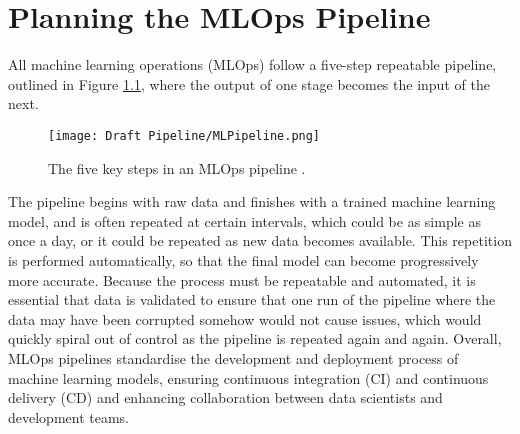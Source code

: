 \chapter{Planning the MLOps Pipeline}\label{ch:PlanMLOps}
All machine learning operations (MLOps) follow a five-step repeatable pipeline, outlined in Figure \ref{fig:MLPipeline}, where the output of one stage
becomes the input of the next. 
\begin{figure}[H]
    \centering
    \texttt{[image: Draft Pipeline/MLPipeline.png]}
    \caption{The five key steps in an MLOps pipeline \autocite{incycle_software_mlops_nodate}.}
    \label{fig:MLPipeline}
\end{figure}
The pipeline begins with raw data and finishes with a trained machine learning model, and is often 
repeated at certain intervals, which could be as simple as once a day, or it could be repeated as new data becomes available. 
This repetition is performed automatically, so that the final model can become progressively more accurate. Because the process 
must be repeatable and automated, it is essential that data is validated to ensure that one run of the pipeline where the data may have 
been corrupted somehow would not cause issues, which would quickly spiral out of control as the pipeline is repeated again and again.
Overall, MLOps pipelines standardise the development and deployment process of machine learning models, ensuring continuous integration
(CI) and continuous delivery (CD) and enhancing collaboration between data scientists and development teams.

\pagebreak